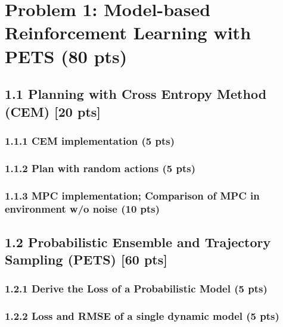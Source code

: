 \documentclass[12pt]{article}
\begin{document}
\newpage
\section*{Problem 1: Model-based Reinforcement Learning with PETS (80 pts)}
\subsection*{1.1 Planning with Cross Entropy Method (CEM) [20 pts]}
\subsubsection*{1.1.1 CEM implementation (5 pts)}
\begin{solution}[height=5cm]
\end{solution}

\subsubsection*{1.1.2 Plan with random actions (5 pts)}
\begin{solution}[height=5cm]
\end{solution}

\newpage
\subsubsection*{1.1.3 MPC implementation; Comparison of MPC in environment w/o noise (10 pts)}
\begin{solution}[height=20cm]
\end{solution}

\subsection*{1.2 Probabilistic Ensemble and Trajectory Sampling (PETS) [60 pts]}
\subsubsection*{1.2.1 Derive the Loss of a Probabilistic Model (5 pts)}
\begin{solution}[height=5cm]
\end{solution}
\newpage
\subsubsection*{1.2.2 Loss and RMSE of a single dynamic model (5 pts)}
\begin{solution}[height=20cm]
\end{solution}
\end{document}
